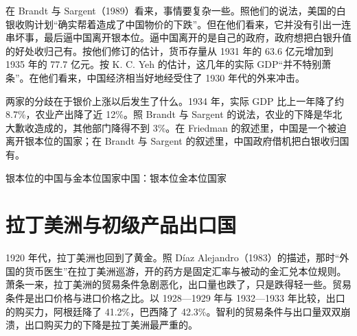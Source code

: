 在 Brandt 与 Sargent（1989）看来，事情要复杂一些。照他们的说法，美国的白银收购计划“确实帮着造成了中国物价的下跌”\cite{brandt1989}。但在他们看来，它并没有引出一连串坏事，最后逼中国离开银本位。逼中国离开的是自己的政府，政府想把白银升值的好处收归己有\cite{brandt1989}。按他们修订的估计，货币存量从 1931 年的 63.6 亿元增加到 1935 年的 77.7 亿元\cite{brandt1989}。按 K. C. Yeh 的估计，这几年的实际 GDP“并不特别萧条”\cite{brandt1989}。在他们看来，中国经济相当好地经受住了 1930 年代的外来冲击\cite{brandt1989}。

两家的分歧在于银价上涨以后发生了什么。1934 年，实际 GDP 比上一年降了约 8.7\%，农业产出降了近 12\%\cite{brandt1989}。照 Brandt 与 Sargent 的说法，农业的下降是华北大歉收造成的，其他部门降得不到 3\%\cite{brandt1989}。在 Friedman 的叙述里，中国是一个被迫离开银本位的国家；在 Brandt 与 Sargent 的叙述里，中国政府借机把白银收归国有。

\begin{compare}{银本位的中国与金本位国家}{中国：银本位}{金本位国家}
\end{compare}

\section{拉丁美洲与初级产品出口国}\label{sec:depressionworld-latam}

1920 年代，拉丁美洲也回到了黄金。照 Díaz Alejandro（1983）的描述，那时“外国的货币医生”在拉丁美洲巡游，开的药方是固定汇率与被动的金汇兑本位规则\cite{diaz1983}。萧条一来，拉丁美洲的贸易条件急剧恶化，出口量也跌了，只是跌得轻一些\cite{diaz1983}。贸易条件是出口价格与进口价格之比。以 1928—1929 年与 1932—1933 年比较，出口的购买力，阿根廷降了 41.2\%，巴西降了 42.3\%\cite{diaz1983}。智利的贸易条件与出口量双双崩溃，出口购买力的下降是拉丁美洲最严重的\cite{diaz1983}。


